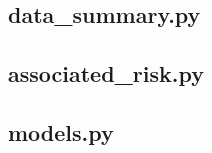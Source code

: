 \documentclass[journal,12pt]{IEEEtran} %
\begin{document}
\subsection{data\_summary.py}\label{subsec:data_summary.py}


\clearpage

\subsection{associated\_risk.py}\label{subsec:associated_risk.py}


\clearpage

\subsection{models.py}\label{subsec:models.py}

\end{document}
